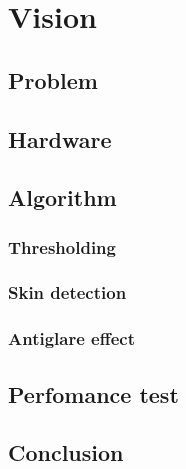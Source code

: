 \chapter{Vision}
\section{Problem}
\section{Hardware}
\section{Algorithm}
\subsection{Thresholding}
\subsection{Skin detection}
\subsection{Antiglare effect}
\section{Perfomance test}
\section{Conclusion}
\newpage
